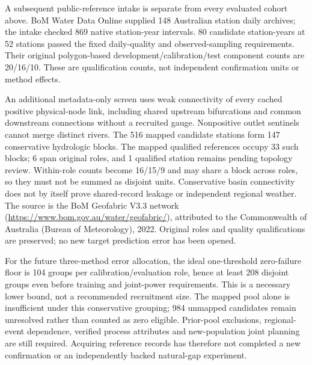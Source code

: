 A subsequent public-reference intake is separate from every evaluated cohort above. BoM Water Data Online supplied 148 Australian station daily archives; the intake checked 869 native station-year intervals. 80 candidate station-years at 52 stations passed the fixed daily-quality and observed-sampling requirements. Their original polygon-based development/calibration/test component counts are 20/16/10. These are qualification counts, not independent confirmation units or method effects.

An additional metadata-only screen uses weak connectivity of every cached positive physical-node link, including shared upstream bifurcations and common downstream connections without a recruited gauge. Nonpositive outlet sentinels cannot merge distinct rivers. The 516 mapped candidate stations form 147 conservative hydrologic blocks. The mapped qualified references occupy 33 such blocks; 6 span original roles, and 1 qualified station remains pending topology review. Within-role counts become 16/15/9 and may share a block across roles, so they must not be summed as disjoint units. Conservative basin connectivity does not by itself prove shared-record leakage or independent regional weather. The source is the BoM Geofabric V3.3 network (\url{https://www.bom.gov.au/water/geofabric/}), attributed to the Commonwealth of Australia (Bureau of Meteorology), 2022. Original roles and quality qualifications are preserved; no new target prediction error has been opened.

For the future three-method error allocation, the ideal one-threshold zero-failure floor is 104 groups per calibration/evaluation role, hence at least 208 disjoint groups even before training and joint-power requirements. This is a necessary lower bound, not a recommended recruitment size. The mapped pool alone is insufficient under this conservative grouping; 984 unmapped candidates remain unresolved rather than counted as zero eligible. Prior-pool exclusions, regional-event dependence, verified process attributes and new-population joint planning are still required. Acquiring reference records has therefore not completed a new confirmation or an independently backed natural-gap experiment.
